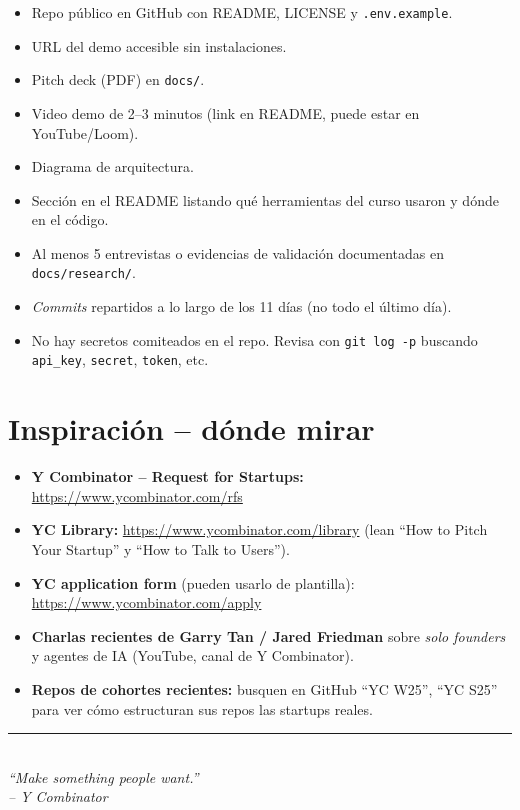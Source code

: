 \documentclass[11pt,a4paper]{article}
\begin{document}
\begin{itemize}[leftmargin=1.5em,label=$\square$,itemsep=1pt,topsep=2pt]
  \item Repo p\'ublico en GitHub con README, LICENSE y \texttt{.env.example}.
  \item URL del demo accesible sin instalaciones.
  \item Pitch deck (PDF) en \texttt{docs/}.
  \item Video demo de 2--3 minutos (link en README, puede estar en YouTube/Loom).
  \item Diagrama de arquitectura.
  \item Secci\'on en el README listando qu\'e herramientas del curso usaron
        y d\'onde en el c\'odigo.
  \item Al menos 5 entrevistas o evidencias de validaci\'on documentadas
        en \texttt{docs/research/}.
  \item \emph{Commits} repartidos a lo largo de los 11 d\'ias (no todo el \'ultimo d\'ia).
  \item No hay secretos comiteados en el repo. Revisa con
        \texttt{git log -p} buscando \texttt{api\_key}, \texttt{secret}, \texttt{token}, etc.
\end{itemize}

\section{Inspiraci\'on -- d\'onde mirar}

\begin{itemize}[leftmargin=1.2em,itemsep=2pt,topsep=2pt]
  \item \textbf{Y Combinator -- Request for Startups:} \url{https://www.ycombinator.com/rfs}
  \item \textbf{YC Library:} \url{https://www.ycombinator.com/library} (lean ``How to
        Pitch Your Startup'' y ``How to Talk to Users'').
  \item \textbf{YC application form} (pueden usarlo de plantilla):
        \url{https://www.ycombinator.com/apply}
  \item \textbf{Charlas recientes de Garry Tan / Jared Friedman} sobre \emph{solo founders}
        y agentes de IA (YouTube, canal de Y Combinator).
  \item \textbf{Repos de cohortes recientes:} busquen en GitHub ``YC W25'', ``YC S25''
        para ver c\'omo estructuran sus repos las startups reales.
\end{itemize}

\vspace{1em}
\begin{center}
{\color{clawOrange}\rule{0.6\linewidth}{1pt}}\\[6pt]
{\itshape\color{clawGray}
``Make something people want.''\\
-- Y Combinator}
\end{center}
\end{document}
